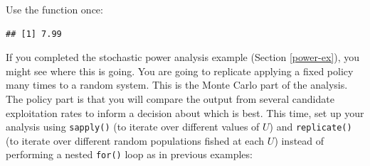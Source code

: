 \documentclass[]{book}
\newenvironment{Shaded}{\begin{snugshade}}{\end{snugshade}}
\newcommand{\CommentTok}[1]{\textcolor[rgb]{0.56,0.35,0.01}{\textit{#1}}}
\newcommand{\ControlFlowTok}[1]{\textcolor[rgb]{0.13,0.29,0.53}{\textbf{#1}}}
\newcommand{\DataTypeTok}[1]{\textcolor[rgb]{0.13,0.29,0.53}{#1}}
\newcommand{\DecValTok}[1]{\textcolor[rgb]{0.00,0.00,0.81}{#1}}
\newcommand{\FloatTok}[1]{\textcolor[rgb]{0.00,0.00,0.81}{#1}}
\newcommand{\KeywordTok}[1]{\textcolor[rgb]{0.13,0.29,0.53}{\textbf{#1}}}
\newcommand{\NormalTok}[1]{#1}
\newcommand{\OperatorTok}[1]{\textcolor[rgb]{0.81,0.36,0.00}{\textbf{#1}}}
\newcommand{\StringTok}[1]{\textcolor[rgb]{0.31,0.60,0.02}{#1}}
\begin{document}
Use the function once:

\begin{Shaded}
\end{Shaded}

\begin{verbatim}
## [1] 7.99
\end{verbatim}

If you completed the stochastic power analysis example (Section \ref{power-ex}), you might see where this is going. You are going to replicate applying a fixed policy many times to a random system. This is the Monte Carlo part of the analysis. The policy part is that you will compare the output from several candidate exploitation rates to inform a decision about which is best. This time, set up your analysis using \texttt{sapply()} (to iterate over different values of \(U\)) and \texttt{replicate()} (to iterate over different random populations fished at each \(U\)) instead of performing a nested \texttt{for()} loop as in previous examples:

\begin{Shaded}
\end{Shaded}
\end{document}
